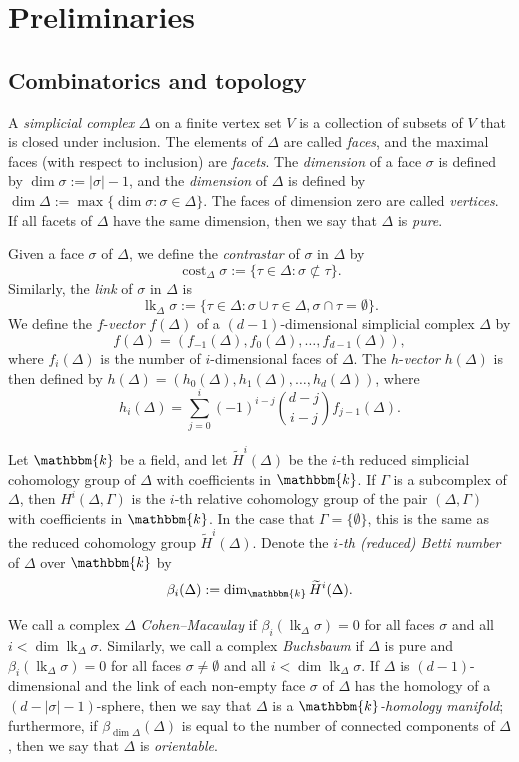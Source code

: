 \documentclass[ALCO,ThmDefs,Unicode]{cedram}
\DeclareMathOperator\lk{lk}
\DeclareMathOperator\cost{cost}
\newcommand{\field}{\mathbbm{k}}
\begin{document}
\section{Preliminaries} \label{sect:preliminaries}

\subsection{Combinatorics and topology}\label{subsect:topo}

A \emph{simplicial complex} $\Delta$ on a finite vertex set $V$ is a collection of subsets of $V$ that is closed under inclusion. The elements of $\Delta$ are called \emph{faces}, and the maximal faces (with respect to inclusion) are \emph{facets}. The \emph{dimension} of a face $\sigma$ is defined by $\dim \sigma :=|\sigma|-1$, and the \emph{dimension} of $\Delta$ is defined by $\dim \Delta := \max\{\dim \sigma: \sigma\in \Delta\}$. The faces of dimension zero are called \emph{vertices}. If all facets of $\Delta$ have the same dimension, then we say that $\Delta$ is \emph{pure}.

Given a face $\sigma$ of $\Delta$, we define the \emph{contrastar} of $\sigma$ in $\Delta$ by
\[
\cost_\Delta \sigma := \{\tau\in \Delta: \sigma\not\subset\tau\}.
\]
Similarly, the \emph{link} of $\sigma$ in $\Delta$ is
\[
\lk_\Delta \sigma := \{\tau\in \Delta: \sigma\cup \tau \in \Delta, \sigma\cap \tau = \emptyset\}.
\]
We define the $f$-\emph{vector} $f(\Delta)$ of a $(d-1)$-dimensional simplicial complex $\Delta$ by
\[
f(\Delta)=(f_{-1}(\Delta), f_0(\Delta), \ldots, f_{d-1}(\Delta)),
\]
where $f_i(\Delta)$ is the number of $i$-dimensional faces of $\Delta$. The $h$-\emph{vector} $h(\Delta)$ is then defined by $h(\Delta)=(h_0(\Delta), h_1(\Delta), \ldots, h_d(\Delta))$, where
\[
h_i(\Delta)=\sum_{j=0}^i(-1)^{i-j}\binom{d-j}{i-j}f_{j-1}(\Delta).
\]


Let $\field$ be a field, and let $\tilde{H}^i(\Delta)$ be the $i$-th reduced simplicial cohomology group of $\Delta$ with coefficients in $\field$. If $\Gamma$ is a subcomplex of $\Delta$, then $H^i(\Delta, \Gamma)$ is the $i$-th relative cohomology group of the pair $(\Delta, \Gamma)$ with coefficients in $\field$. In the case that $\Gamma=\{\emptyset\}$, this is the same as the reduced cohomology group $\tilde{H}^i(\Delta)$. Denote the $i$\emph{-th (reduced) Betti number} of $\Delta$ over $\field$ by
\[
\beta_i(\Delta):=\dim_\field \widetilde{H}^i(\Delta).
\]

We call a complex $\Delta$ \emph{Cohen--Macaulay} if $\beta_i(\lk_\Delta \sigma)=0$ for all faces $\sigma$ and all $i<\dim \lk_\Delta \sigma$. Similarly, we call a complex \emph{Buchsbaum} if $\Delta$ is pure and $\beta_i(\lk_\Delta \sigma)=0$ for all faces $\sigma\not=\emptyset$ and all $i<\dim \lk_\Delta \sigma$. If $\Delta$ is $(d-1)$-dimensional and the link of each non-empty face $\sigma$ of $\Delta$ has the homology of a $(d-|\sigma|-1)$-sphere, then we say that $\Delta$ is a $\field$\emph{-homology manifold}; furthermore, if $\beta_{\dim\Delta}(\Delta)$ is equal to the number of connected components of $\Delta$, then we say that $\Delta$ is \emph{orientable}.
\end{document}
